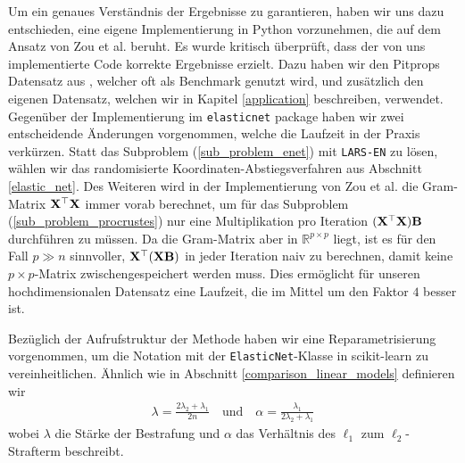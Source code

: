 Um ein genaues Verständnis der Ergebnisse zu garantieren, haben wir uns dazu entschieden, eine eigene Implementierung in Python vorzunehmen, die auf dem Ansatz von Zou et al. beruht. Es wurde kritisch überprüft, dass der von uns implementierte Code korrekte Ergebnisse erzielt. Dazu haben  wir den Pitprops Datensatz aus \cite{zou_sparsepca}, welcher oft als Benchmark genutzt wird, und zusätzlich den eigenen Datensatz, welchen wir in Kapitel \ref{application} beschreiben, verwendet. Gegenüber der Implementierung im \texttt{elasticnet} package haben wir zwei entscheidende Änderungen vorgenommen, welche die Laufzeit in der Praxis verkürzen. Statt das Subproblem (\ref{sub_problem_enet}) mit \texttt{LARS-EN} zu lösen, wählen wir das randomisierte Koordinaten-Abstiegsverfahren aus Abschnitt \ref{elastic_net}. Des Weiteren wird in der Implementierung von Zou et al. die Gram-Matrix $\mathbf{X}^{\top} \mathbf{X}$ immer vorab berechnet, um für das Subproblem (\ref{sub_problem_procrustes}) nur eine Multiplikation pro Iteration $(\mathbf{X}^{\top} \mathbf{X}) \mathbf{B}$ durchführen zu müssen. Da die Gram-Matrix aber in $\mathbb{R}^{p \times p}$ liegt, ist es für den Fall $p \gg n$ sinnvoller, $\mathbf{X}^{\top} (\mathbf{X} \mathbf{B})$ in jeder Iteration naiv zu berechnen, damit keine $p \times p$-Matrix zwischengespeichert werden muss. Dies ermöglicht für unseren hochdimensionalen Datensatz eine Laufzeit, die im Mittel um den Faktor $4$ besser ist.

Bezüglich der Aufrufstruktur der Methode haben wir eine Reparametrisierung vorgenommen, um die Notation mit der \texttt{ElasticNet}-Klasse in scikit-learn zu vereinheitlichen. Ähnlich wie in Abschnitt \ref{comparison_linear_models} definieren wir
\begin{align}
\lambda = \frac{2\lambda_2 + \lambda_1}{2n} \quad \text{und} \quad \alpha = \frac{\lambda_1}{2\lambda_2 + \lambda_1}
\end{align}
wobei $\lambda$ die Stärke der Bestrafung und $\alpha$ das Verhältnis des $\ell_1$ zum $\ell_2$-Strafterm beschreibt.